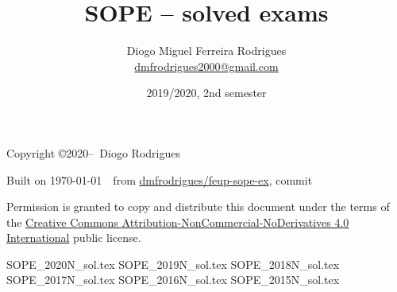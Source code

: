 \documentclass{sope}
\title{SOPE -- solved exams}
\author{Diogo Miguel Ferreira Rodrigues \\ \href{mailto:dmfrodrigues2000@gmail.com}{dmfrodrigues2000@gmail.com}}
\date{2019/2020, 2nd semester}
\begin{document}
\frontmatter
\maketitle
\begin{secondpage}
    Copyright \copyright 2020--\the\year\ Diogo Rodrigues\par
    \immediate{}
    \par
    Built on \today~\currenttime~from \href{https://github.com/dmfrodrigues/feup-sope-ex}{dmfrodrigues/feup-sope-ex}, commit \par
    Permission is granted to copy and distribute this document under the terms of the
    \href{https://creativecommons.org/licenses/by-nc-nd/4.0/}{Creative Commons Attribution-NonCommercial-NoDerivatives 4.0 International}
    public license.
\end{secondpage}
\setcounter{tocdepth}{2}
\tableofcontents
\mainmatter
{SOPE_2020N_sol.tex}
{SOPE_2019N_sol.tex}
{SOPE_2018N_sol.tex}
{SOPE_2017N_sol.tex}
{SOPE_2016N_sol.tex}
{SOPE_2015N_sol.tex}
\end{document}
